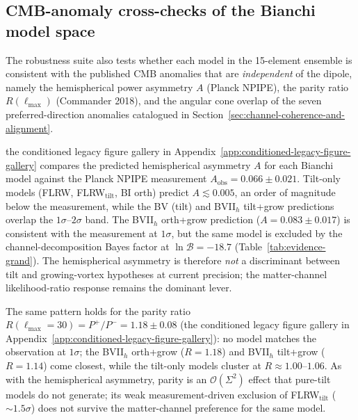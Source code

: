 

\subsection{CMB-anomaly cross-checks of the Bianchi model space}
\label{sec:cmb-anomaly-cross-checks}

The robustness suite also tests whether each model in the 15-element
ensemble is consistent with the published CMB anomalies that are
\emph{independent} of the dipole, namely the hemispherical power
asymmetry $A$ (Planck NPIPE), the parity ratio $R(\ell_{\mathrm{max}})$
(Commander 2018), and the angular cone overlap of the seven
preferred-direction anomalies catalogued in
Section~\ref{sec:channel-coherence-and-alignment}.

the conditioned legacy figure gallery in Appendix~\ref{app:conditioned-legacy-figure-gallery} compares the
predicted hemispherical asymmetry $A$ for each Bianchi model against
the Planck NPIPE measurement $A_{\mathrm{obs}} = 0.066 \pm 0.021$.
Tilt-only models (FLRW, FLRW$_{\mathrm{tilt}}$, BI orth) predict
$A \lesssim 0.005$, an order of magnitude below the measurement, while
the BV (tilt) and BVII$_h$ tilt+grow predictions overlap the
$1\sigma$--$2\sigma$ band.  The BVII$_h$ orth+grow prediction
($A = 0.083 \pm 0.017$) is consistent with the measurement at
$1\sigma$, but the same model is excluded by the channel-decomposition
Bayes factor at $\ln\mathcal{B} = -18.7$
(Table~\ref{tab:evidence-grand}).
The hemispherical asymmetry is therefore \emph{not} a discriminant
between tilt and growing-vortex hypotheses at current precision; the
matter-channel likelihood-ratio response remains the dominant lever.

The same pattern holds for the parity ratio $R(\ell_{\mathrm{max}}=30)
= P^+/P^- = 1.18 \pm 0.08$ (the conditioned legacy figure gallery in Appendix~\ref{app:conditioned-legacy-figure-gallery}):
no model matches the observation at $1\sigma$; the BVII$_h$ orth+grow
($R = 1.18$) and BVII$_h$ tilt+grow ($R = 1.14$) come closest, while
the tilt-only models cluster at $R \approx 1.00$--$1.06$.  As with the
hemispherical asymmetry, parity is an
$\mathcal{O}(\Sigma^{2})$ effect that pure-tilt models do not generate;
its weak measurement-driven exclusion of FLRW$_{\mathrm{tilt}}$
($\sim 1.5\sigma$) does not survive the matter-channel preference for
the same model.

